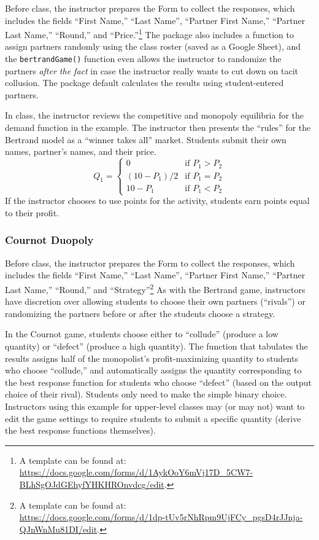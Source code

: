 \documentclass[
]{article}
\begin{document}
Before class, the instructor prepares the Form to collect the responses,
which includes the fields ``First Name,'' ``Last Name'', ``Partner First
Name,'' ``Partner Last Name,'' ``Round,'' and ``Price.''\footnote{A
  template can be found at:\\
  \url{https://docs.google.com/forms/d/1AykOoY6mVj17D_5CW7-BLhSgOJdGEhyfYHKHROnvdcg/edit}.}
The package also includes a function to assign partners randomly using
the class roster (saved as a Google Sheet), and the
\texttt{bertrandGame()} function even allows the instructor to randomize
the partners \emph{after the fact} in case the instructor really wants
to cut down on tacit collusion. The package default calculates the
results using student-entered partners.

In class, the instructor reviews the competitive and monopoly equilibria
for the demand function in the example. The instructor then presents the
``rules'' for the Bertrand model as a ``winner takes all'' market.
Students submit their own names, partner's names, and their price. \[
Q_1 = \begin{cases}
    0 & \text{if } P_1 > P_2 \\ 
    (10 - P_1)/2 & \text{if } P_1 = P_2 \\
    10 - P_1 & \text{if } P_1 < P_2 
\end{cases}
\] If the instructor chooses to use points for the activity, students
earn points equal to their profit.

\hypertarget{cournot-duopoly}{%
\subsubsection{Cournot Duopoly}\label{cournot-duopoly}}

Before class, the instructor prepares the Form to collect the responses,
which includes the fields ``First Name,'' ``Last Name'', ``Partner First
Name,'' ``Partner Last Name,'' ``Round,'' and ``Strategy''\footnote{A
  template can be found at:\\
  \url{https://docs.google.com/forms/d/1dp-tUv5rNhRpm9UjFCy_pgsD4rJJnja-QJnWnMu81DI/edit}.}
As with the Bertrand game, instructors have discretion over allowing
students to choose their own partners (``rivals'') or randomizing the
partners before or after the students choose a strategy.

In the Cournot game, students choose either to ``collude'' (produce a
low quantity) or ``defect'' (produce a high quantity). The function that
tabulates the results assigns half of the monopolist's profit-maximizing
quantity to students who choose ``collude,'' and automatically assigns
the quantity corresponding to the best response function for students
who choose ``defect'' (based on the output choice of their rival).
Students only need to make the simple binary choice. Instructors using
this example for upper-level classes may (or may not) want to edit the
game settings to require students to submit a specific quantity (derive
the best response functions themselves).
\end{document}

